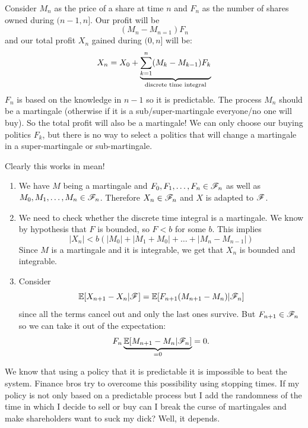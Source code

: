 \documentclass{report}
\begin{document}
\begin{example}
	Consider $M_{n}$ as the price of a share at time $n$ and $F_{n}$ as the number of shares owned during $(n-1,n]$. Our profit will be 
	\[(M_{n}-M_{n=1})F_{n}\]
	and our total profit $X_{n}$ gained during $(0,n]$ will be:
	\[X_{n}=X_{0}+\underbrace{\sum_{k=1}^{n}(M_{k}-M_{k-1})F_{k}}_{\mathclap{\text{discrete time integral}}}\]
	$F_{n}$ is based on the knowledge in $n-1$ so it is predictable. The process $M_{n}$ should be a martingale (otherwise if it is a sub/super-martingale everyone/no one will buy). So the total profit will also be a martingale! We can only choose our buying politics $F_{k}$, but there is no way to select a politics that will change a martingale in a super-martingale or sub-martingale.
\end{example}
Clearly this works in mean! 
\begin{fancyproof}
\begin{enumerate}
	\item	We have $M$ being a martingale and $F_0,F_1,\ldots,F_n\in\mathscr{F}_{n}$ as well as $M_0,M_1,\ldots,M_{n}\in\mathscr{F}_n$. Therefore $X_{n}\in\mathscr{F}_{n}$ and $X$ is adapted to $\mathscr{F}$.
	\item We need to check whether the discrete time integral is a martingale. We know by hypothesis that $F$ is bounded, so $F<b$ for some $b$. This implies
	\begin{equation*}
		|X_{n}|<b(|M_{0}|+|M_1+M_0|+\ldots+|M_n-M_{n-1}|)
 	\end{equation*}
	Since $M$ is a martingale and it is integrable, we get that $X_n$ is bounded and integrable.
	\item Consider
	\begin{equation*}
		\mathbb{E}[X_{n+1}-X_{n}|\mathscr{F}]=\mathbb{E}[F_{n+1}(M_{n+1}-M_{n})|\mathscr{F}_n]
	\end{equation*}
	since all the terms cancel out and only the last ones survive. But $F_{n+1}\in\mathscr{F}_{n}$ so we can take it out of the expectation:
	\[F_{n}\underbrace{\mathbb{E}[M_{n+1}-M_{n}|\mathscr{F}_{n}]}_{=0}=0.\]
\end{enumerate}
\end{fancyproof}
We know that using a policy that it is predictable it is impossible to beat the system. Finance bros try to overcome this possibility using stopping times. If my policy is not only based on a predictable process but I add the randomness of the time in which I decide to sell or buy can I break the curse of martingales and make shareholders want to suck my dick? Well, it depends.
\end{document}
